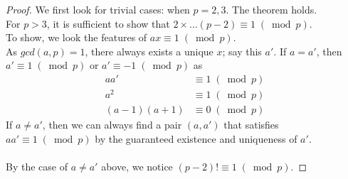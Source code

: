 \begin{proof}
We first look for trivial cases: when $p = 2,3$. The theorem holds. \\
For $p > 3$, it is sufficient to show that $2\times \dots (p - 2)\equiv 1\; (\bmod{p})$. \\
To show, we look the features of $ax\equiv 1\; (\bmod{p})$. \\
As $gcd(a, p) = 1$, there always exists a unique $x$; say this $a'$.
If $a = a'$, then $a'\equiv 1\; (\bmod{p})$ or $a'\equiv -1\; (\bmod{p})$ as 
\begin{align*}
aa' &\equiv 1\; (\bmod{p}) \\
a^{2} &\equiv 1\; (\bmod{p}) \\
(a - 1)(a + 1) &\equiv 0\; (\bmod{p})
\end{align*}
If $a\neq a'$, then we can always find a pair $(a, a')$ that satisfies $aa'\equiv 1\; (\bmod{p})$ by the guaranteed existence and uniqueness of $a'$. \\
\\
By the case of $a\neq a'$ above, we notice $(p - 2)!\equiv 1\; (\bmod{p})$.
\end{proof}
